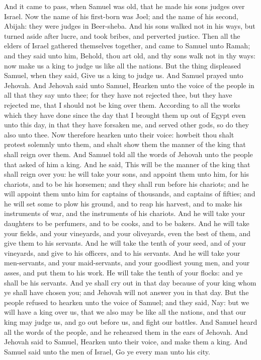 And it came to pass, when Samuel was old, that he made his sons judges over Israel. Now the name of his first-born was Joel; and the name of his second, Abijah: they were judges in Beer-sheba. And his sons walked not in his ways, but turned aside after lucre, and took bribes, and perverted justice.  Then all the elders of Israel gathered themselves together, and came to Samuel unto Ramah; and they said unto him, Behold, thou art old, and thy sons walk not in thy ways: now make us a king to judge us like all the nations. But the thing displeased Samuel, when they said, Give us a king to judge us. And Samuel prayed unto Jehovah. And Jehovah said unto Samuel, Hearken unto the voice of the people in all that they say unto thee; for they have not rejected thee, but they have rejected me, that I should not be king over them. According to all the works which they have done since the day that I brought them up out of Egypt even unto this day, in that they have forsaken me, and served other gods, so do they also unto thee. Now therefore hearken unto their voice: howbeit thou shalt protest solemnly unto them, and shalt show them the manner of the king that shall reign over them.  And Samuel told all the words of Jehovah unto the people that asked of him a king. And he said, This will be the manner of the king that shall reign over you: he will take your sons, and appoint them unto him, for his chariots, and to be his horsemen; and they shall run before his chariots; and he will appoint them unto him for captains of thousands, and captains of fifties; and he will set some to plow his ground, and to reap his harvest, and to make his instruments of war, and the instruments of his chariots. And he will take your daughters to be perfumers, and to be cooks, and to be bakers. And he will take your fields, and your vineyards, and your oliveyards, even the best of them, and give them to his servants. And he will take the tenth of your seed, and of your vineyards, and give to his officers, and to his servants. And he will take your men-servants, and your maid-servants, and your goodliest young men, and your asses, and put them to his work. He will take the tenth of your flocks: and ye shall be his servants. And ye shall cry out in that day because of your king whom ye shall have chosen you; and Jehovah will not answer you in that day.  But the people refused to hearken unto the voice of Samuel; and they said, Nay: but we will have a king over us, that we also may be like all the nations, and that our king may judge us, and go out before us, and fight our battles. And Samuel heard all the words of the people, and he rehearsed them in the ears of Jehovah. And Jehovah said to Samuel, Hearken unto their voice, and make them a king. And Samuel said unto the men of Israel, Go ye every man unto his city. 

